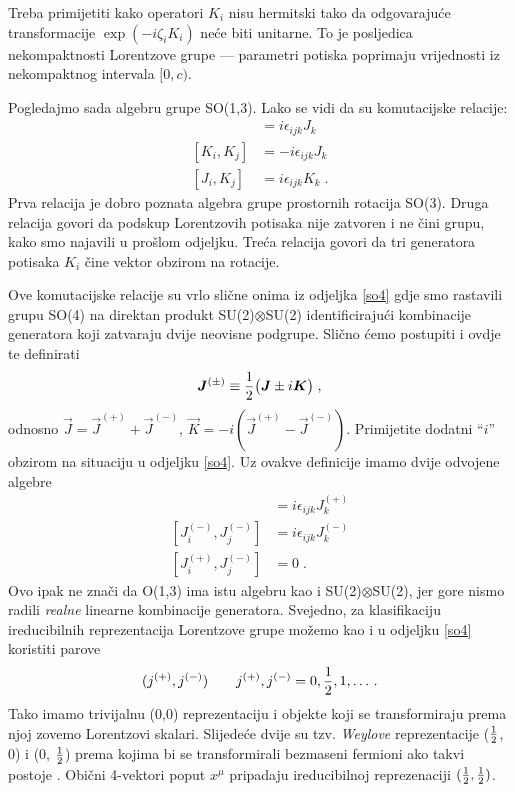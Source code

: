 Treba primijetiti kako operatori $K_i$ nisu hermitski tako da odgovarajuće
transformacije $\exp(-i\zeta_i K_i)$ neće biti unitarne. To je posljedica
nekompaktnosti Lorentzove grupe --- parametri potiska poprimaju
vrijednosti iz nekompaktnog intervala $[0,c)$.

Pogledajmo sada algebru grupe SO(1,3). Lako se vidi da su
komutacijske relacije:
\begin{align}
[J_i, J_j] &= i\epsilon_{ijk} J_k  \label{eq:LK1}\\
[K_i, K_j] &= -i\epsilon_{ijk} J_k \\
[J_i, K_j] &= i\epsilon_{ijk} K_k \;. \label{eq:LK3}
\end{align}
Prva relacija je dobro poznata algebra grupe prostornih rotacija SO(3).
Druga relacija govori da podskup Lorentzovih potisaka nije zatvoren
i ne čini grupu, kako smo najavili u prošlom odjeljku. Treća
relacija govori da tri generatora potisaka $K_i$ čine vektor obzirom
na rotacije.

Ove komutacijske relacije su vrlo slične onima iz odjeljka \ref{so4} gdje smo 
rastavili grupu SO(4) na direktan produkt SU(2)$\otimes$SU(2) identificirajući
kombinacije generatora koji zatvaraju dvije neovisne podgrupe.
Slično ćemo postupiti i ovdje te definirati
\begin{equation}
  \vec{J}^{(\pm)} \equiv \fhalf \big(\vec{J}\pm i \vec{K} \big) \;,
\end{equation}
odnosno $\vec{J}=\vec{J}^{(+)}+\vec{J}^{(-)}$, $\vec{K} = -i
(\vec{J}^{(+)}-\vec{J}^{(-)})$. Primijetite dodatni ``$i$'' obzirom
na situaciju u odjeljku \ref{so4}.
Uz ovakve definicije imamo dvije odvojene algebre
\begin{align}
[J_{i}^{(+)}, J_{j}^{(+)}] &= i \epsilon_{ijk} J_{k}^{(+)} \\
[J_{i}^{(-)}, J_{j}^{(-)}] &= i \epsilon_{ijk} J_{k}^{(-)} \\
[J_{i}^{(+)}, J_{j}^{(-)}] &= 0  \;.
\end{align}
Ovo ipak ne znači  da O(1,3) ima istu algebru kao i SU(2)$\otimes$SU(2),
jer gore nismo radili \emph{realne} linearne kombinacije generatora.
Svejedno, za klasifikaciju ireducibilnih reprezentacija Lorentzove
grupe možemo kao i u odjeljku \ref{so4} koristiti parove
\begin{equation}
(j^{(+)}, j^{(-)})  \qquad j^{(+)}, j^{(-)} = 0, \frac{1}{2}, 1, \dotsc .
\end{equation}
Tako imamo trivijalnu (0,0) reprezentaciju i objekte koji se
transformiraju prema njoj zovemo Lorentzovi skalari. Slijedeće
dvije su tzv. \emph{Weylove} reprezentacije ($\frac{1}{2}$, 0) i
(0, $\frac{1}{2}$) prema kojima bi se transformirali bezmaseni
fermioni ako takvi postoje .
Obični 4-vektori poput $x^\mu$ pripadaju ireducibilnoj
reprezenaciji $(\frac{1}{2}, \frac{1}{2})$.

